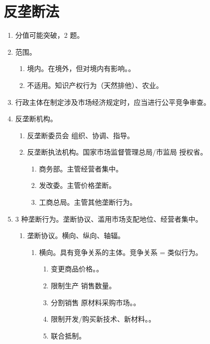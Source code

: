 \section{反垄断法}
\begin{enumerate}
  \item 分值可能突破，2 题。
  \item 范围。
        \begin{enumerate}
          \item \yi 境内。\er 在境外，但对境内有影响。。
          \item 不适用。知识产权行为（天然排他）、农业。
        \end{enumerate}
  \item 行政主体在制定涉及市场经济规定时，应当进行公平竞争审查。
  \item 反垄断机构。
        \begin{enumerate}
          \item 反垄断委员会 \yjt 组织、协调、指导。
          \item 反垄断执法机构。国家市场监督管理总局/市监局 \yjt 授权省。
                \begin{enumerate}
                  \item 商务部。主管经营者集中。
                  \item 发改委。主管价格垄断。
                  \item 工商总局。主管其他垄断行为。
                \end{enumerate}
        \end{enumerate}
  \item 3 种垄断行为。垄断协议、滥用市场支配地位、经营者集中。
        \begin{enumerate}
          \item 垄断协议。横向、纵向、轴辐。
                \begin{enumerate}
                  \item 横向。具有竞争关系的主体。竞争关系 = 类似行为。
                        \begin{enumerate}
                          \item 变更商品价格。。
                          \item 限制生产 \hz 销售数量。
                          \item 分割销售 \hz 原材料采购市场。。
                          \item 限制开发/购买新技术、新材料。。
                          \item 联合抵制。

\end{enumerate}
\end{enumerate}
\end{enumerate}
\end{enumerate}
